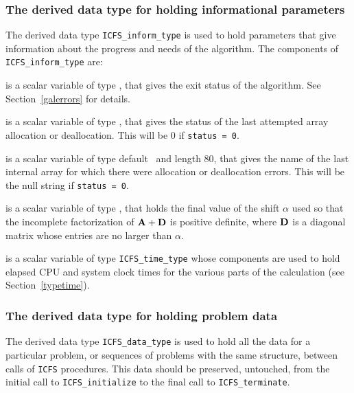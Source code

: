 \documentclass{galahad}
\newcommand{\packagename}{ICFS}
\begin{document}

\subsubsection{The derived data type for holding informational
 parameters}\label{typeinform}
The derived data type
{\tt \packagename\_inform\_type}
is used to hold parameters that give information about the progress and needs
of the algorithm. The components of
{\tt \packagename\_inform\_type}
are:

\begin{description}
 is a scalar variable of type \integer, that gives the
exit status of the algorithm.
See Section~\ref{galerrors} for details.

 is a scalar variable of type \integer, that gives
the status of the last attempted array allocation or deallocation.
This will be 0 if {\tt status = 0}.

 is a scalar variable of type default \character\
and length 80, that  gives the name of the last internal array
for which there were allocation or deallocation errors.
This will be the null string if {\tt status = 0}.

 is a scalar variable of type \realdp, that holds
the final value of the shift $\alpha$ used so that the incomplete
factorization of ${\mathbf{A}} + {\mathbf{D}}$ is positive definite, where ${\mathbf{D}}$ is
a diagonal matrix whose entries are no larger than $\alpha$.

 is a scalar variable of type {\tt \packagename\_time\_type}
whose components are used to hold elapsed CPU and system clock times for the
various parts of the calculation (see Section~\ref{typetime}).

\end{description}


\subsubsection{The derived data type for holding problem data}\label{typedata}
The derived data type
{\tt \packagename\_data\_type}
is used to hold all the data for a particular problem,
or sequences of problems with the same structure, between calls of
{\tt \packagename} procedures.
This data should be preserved, untouched,
from the initial call to
{\tt \packagename\_initialize}
to the final call to
{\tt \packagename\_terminate}.
\end{document}
